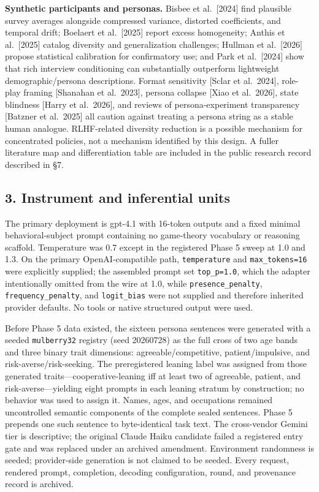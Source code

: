 \documentclass[
  11pt]{article}
\begin{document}
\textbf{Synthetic participants and personas.} Bisbee et al.~{[}2024{]}
find plausible survey averages alongside compressed variance, distorted
coefficients, and temporal drift; Boelaert et al.~{[}2025{]} report
excess homogeneity; Anthis et al.~{[}2025{]} catalog diversity and
generalization challenges; Hullman et al.~{[}2026{]} propose statistical
calibration for confirmatory use; and Park et al.~{[}2024{]} show that
rich interview conditioning can substantially outperform lightweight
demographic/persona descriptions. Format sensitivity {[}Sclar et
al.~2024{]}, role-play framing {[}Shanahan et al.~2023{]}, persona
collapse {[}Xiao et al.~2026{]}, state blindness {[}Harry et
al.~2026{]}, and reviews of persona-experiment transparency {[}Batzner
et al.~2025{]} all caution against treating a persona string as a stable
human analogue. RLHF-related diversity reduction is a possible mechanism
for concentrated policies, not a mechanism identified by this design. A
fuller literature map and differentiation table are included in the
public research record described in §7.

\subsection{3. Instrument and inferential
units}\label{instrument-and-inferential-units}

The primary deployment is gpt-4.1 with 16-token outputs and a fixed
minimal behavioral-subject prompt containing no game-theory vocabulary
or reasoning scaffold. Temperature was 0.7 except in the registered
Phase 5 sweep at 1.0 and 1.3. On the primary OpenAI-compatible path,
\texttt{temperature} and \texttt{max\_tokens=16} were explicitly
supplied; the assembled prompt set \texttt{top\_p=1.0}, which the
adapter intentionally omitted from the wire at 1.0, while
\texttt{presence\_penalty}, \texttt{frequency\_penalty}, and
\texttt{logit\_bias} were not supplied and therefore inherited provider
defaults. No tools or native structured output were used.

Before Phase 5 data existed, the sixteen persona sentences were
generated with a seeded \texttt{mulberry32} registry (seed 20260728) as
the full cross of two age bands and three binary trait dimensions:
agreeable/competitive, patient/impulsive, and risk-averse/risk-seeking.
The preregistered leaning label was assigned from those generated
traits---cooperative-leaning iff at least two of agreeable, patient, and
risk-averse---yielding eight prompts in each leaning stratum by
construction; no behavior was used to assign it. Names, ages, and
occupations remained uncontrolled semantic components of the complete
sealed sentences. Phase 5 prepends one such sentence to byte-identical
task text. The cross-vendor Gemini tier is descriptive; the original
Claude Haiku candidate failed a registered entry gate and was replaced
under an archived amendment. Environment randomness is seeded;
provider-side generation is not claimed to be seeded. Every request,
rendered prompt, completion, decoding configuration, round, and
provenance record is archived.
\end{document}
